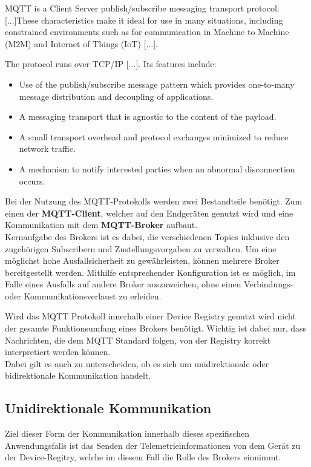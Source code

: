 \begin{definition}[MQTT]
    MQTT\autocite{standard2014mqtt} is a Client Server publish/subscribe messaging transport protocol. [...]These characteristics make it ideal for use in many situations, including constrained environments such as for communication in Machine to Machine (M2M) and Internet of Things (IoT) [...].

    The protocol runs over TCP/IP [...]. Its features include:

    \begin{itemize}
        \item Use of the publish/subscribe message pattern which provides one-to-many message distribution and decoupling of applications.
        \item A messaging transport that is agnostic to the content of the payload.
        \item A small transport overhead and protocol exchanges minimized to reduce network traffic.
        \item A mechanism to notify interested parties when an abnormal disconnection occurs.
    \end{itemize}
\end{definition}

Bei der Nutzung des MQTT-Protokolls werden zwei Bestandteile benötigt. Zum einen der \textbf{MQTT-Client}, welcher auf den Endgeräten genutzt wird und eine Kommunikation mit dem \textbf{MQTT-Broker} aufbaut.\\ Kernaufgabe des Brokers ist es dabei, die verschiedenen Topics inklusive den zugehörigen Subscribern und Zustellungsvorgaben zu verwalten. Um eine möglichst hohe Ausfallsicherheit zu gewährleisten, können mehrere Broker bereitgestellt werden. Mithilfe entsprechender Konfiguration ist es möglich, im Falle eines Ausfalls auf andere Broker auszuweichen, ohne einen Verbindungs- oder Kommunikationsverlaust zu erleiden.

Wird das \ac{MQTT} Protokoll innerhalb einer Device Registry genutzt wird nicht der gesamte Funktionsumfang eines Brokers benötigt. Wichtig ist dabei nur, dass Nachrichten, die dem \ac{MQTT} Standard folgen, von der Registry korrekt interpretiert werden können.\\
Dabei gilt es auch zu unterscheiden, ob es sich um unidirektionale oder bidirektionale Kommunikation handelt. 

\subsection*{Unidirektionale Kommunikation}
Ziel dieser Form der Kommunikation innerhalb dieses spezifischen Anwendungsfalls ist das Senden der Telemetrieinformationen von dem Gerät zu der Device-Regitry, welche im diesem Fall die Rolle des Brokers einnimmt.

